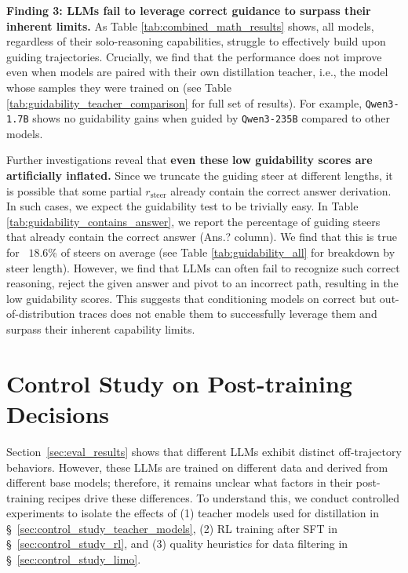 \documentclass{article} %
\begin{document}
\textbf{Finding 3: LLMs fail to leverage correct guidance to surpass their inherent limits.} As Table \ref{tab:combined_math_results} shows, all models, regardless of their solo-reasoning capabilities, struggle to effectively build upon guiding trajectories. Crucially, we find that the performance does not improve even when models are paired with their own distillation teacher, i.e., the model whose samples they were trained on (see Table \ref{tab:guidability_teacher_comparison} for full set of results). For example, \texttt{Qwen3-1.7B} shows no guidability gains when guided by \texttt{Qwen3-235B} compared to other models.  

Further investigations reveal that \textbf{even these low guidability scores are artificially inflated.} Since we truncate the guiding steer at different lengths, it is possible that some partial $r_\mathrm{steer}$ already contain the correct answer derivation. In such cases, we expect the guidability test to be trivially easy. In Table \ref{tab:guidability_contains_answer}, we report the percentage of guiding steers that already contain the correct answer (Ans.? column). We find that this is true for ~$18.6$\% of steers on average (see Table \ref{tab:guidability_all} for breakdown by steer length). However, we find that LLMs can often fail to recognize such correct reasoning, reject the given answer and pivot to an incorrect path, resulting in the low guidability scores.  This suggests that conditioning models on correct but out-of-distribution traces does not enable them to successfully leverage them and surpass their inherent capability limits.

\section{Control Study on Post-training Decisions}
\label{sec:control_study}

Section~\ref{sec:eval_results} shows that different LLMs exhibit distinct off-trajectory behaviors. However, these LLMs are trained on different data and derived from different base models; therefore, it remains unclear what factors in their post-training recipes drive these differences. To understand this, we conduct controlled experiments to isolate the effects of (1) teacher models used for distillation in \S~\ref{sec:control_study_teacher_models}, (2) RL training after SFT in \S~\ref{sec:control_study_rl}, and (3) quality heuristics for data filtering in \S~\ref{sec:control_study_limo}.
\end{document}
